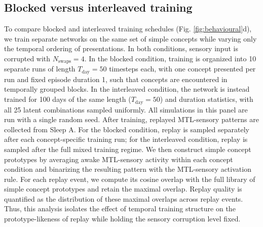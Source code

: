 \documentclass{article}
\begin{document}
\subsection*{Blocked versus interleaved training}
To compare blocked and interleaved training schedules (Fig. \ref{fig:behavioural}d), we train separate networks on the same set of simple concepts while varying only the temporal ordering of presentations. In both conditions, sensory input is corrupted with $N_\mathrm{swaps}=4$. In the blocked condition, training is organized into 10 separate runs of length $T_\mathrm{day}=50$ timesteps each, with one concept presented per run and fixed episode duration 1, such that concepts are encountered in temporally grouped blocks. In the interleaved condition, the network is instead trained for 100 days of the same length ($T_\mathrm{day}=50$) and duration statistics, with all 25 latent combinations sampled uniformly. All simulations in this panel are run with a single random seed.
\newline\newline
After training, replayed MTL-sensory patterns are collected from Sleep A. For the blocked condition, replay is sampled separately after each concept-specific training run; for the interleaved condition, replay is sampled after the full mixed training regime. We then construct simple concept prototypes by averaging awake MTL-sensory activity within each concept condition and binarizing the resulting pattern with the MTL-sensory activation rule.
\newline\newline
For each replay event, we compute its cosine overlap with the full library of simple concept prototypes and retain the maximal overlap. Replay quality is quantified as the distribution of these maximal overlaps across replay events. Thus, this analysis isolates the effect of temporal training structure on the prototype-likeness of replay while holding the sensory corruption level fixed.
\end{document}
